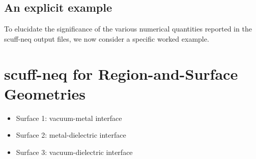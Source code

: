 \documentclass[letterpaper]{article}
\begin{document}
\subsection{An explicit example}

To elucidate the significance of the various numerical
quantities reported in the {\sc scuff-neq} output files,
we now consider a specific worked example.

\newpage
\section{{\sc scuff-neq} for Region-and-Surface Geometries}

\begin{itemize}
 \item Surface 1: vacuum-metal interface
 \item Surface 2: metal-dielectric interface
 \item Surface 3: vacuum-dielectric interface
\end{itemize}
\end{document}
